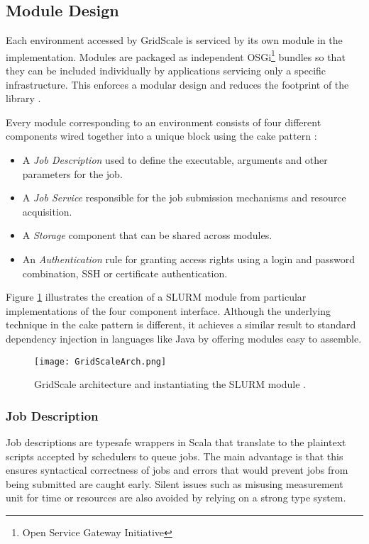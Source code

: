 \subsection{Module Design}

Each environment accessed by GridScale is serviced by its own module in the implementation. Modules are packaged as independent OSGi\footnote{Open Service Gateway Initiative} \cite{OSGi} bundles so that they can be included individually by applications servicing only a specific infrastructure. This enforces a modular design and reduces the footprint of the library \cite{Reuillon2016}.

Every module corresponding to an environment consists of four different components wired together into a unique block using the cake pattern \cite{Cake}:

\begin{itemize}
	\item A \textit{Job Description} used to define the executable, arguments and other parameters for the job.
	\item A \textit{Job Service} responsible for the job submission mechanisms and resource acquisition.
	\item A \textit{Storage} component that can be shared across modules.
	\item An \textit{Authentication} rule for granting access rights using a login and password combination, SSH or certificate authentication.
\end{itemize}

Figure \ref{GridScaleArch} illustrates the creation of a SLURM module from particular implementations of the four component interface. Although the underlying technique in the cake pattern is different, it achieves a similar result to standard dependency injection in languages like Java by offering modules easy to assemble.

\begin{figure}[h]
	\centering
		\texttt{[image: GridScaleArch.png]}
	\caption{GridScale architecture and instantiating the SLURM module \cite{Reuillon2016}.}
	\label{GridScaleArch}
\end{figure}

\subsubsection{Job Description}

Job descriptions are typesafe wrappers in Scala that translate to the plaintext scripts accepted by schedulers to queue jobs. The main advantage is that this ensures syntactical correctness of jobs and errors that would prevent jobs from being submitted are caught early. Silent issues such as misusing measurement unit for time or resources are also avoided by relying on a strong type system. 

